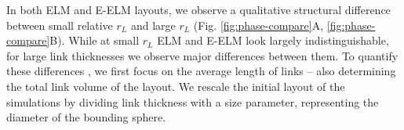 \documentclass[nofootinbib,preprint,floatfix,titlepage,endfloats]{revtex4} %
\begin{document}
In both ELM and E-ELM layouts, we observe a qualitative structural difference between small relative $r_L$ and large $r_L$ (Fig. \ref{fig:phase-compare}A, \ref{fig:phase-compare}B). While at small $r_L$ ELM and E-ELM look largely indistinguishable, for large link thicknesses we observe major differences between them. 
%
To quantify these differences %
, we first focus on the 
%
%
average length of links -- also determining the total link volume of the layout.
We rescale the initial layout of the simulations %
by dividing link thickness with a size parameter, representing
the diameter of the bounding sphere. 
\end{document}
